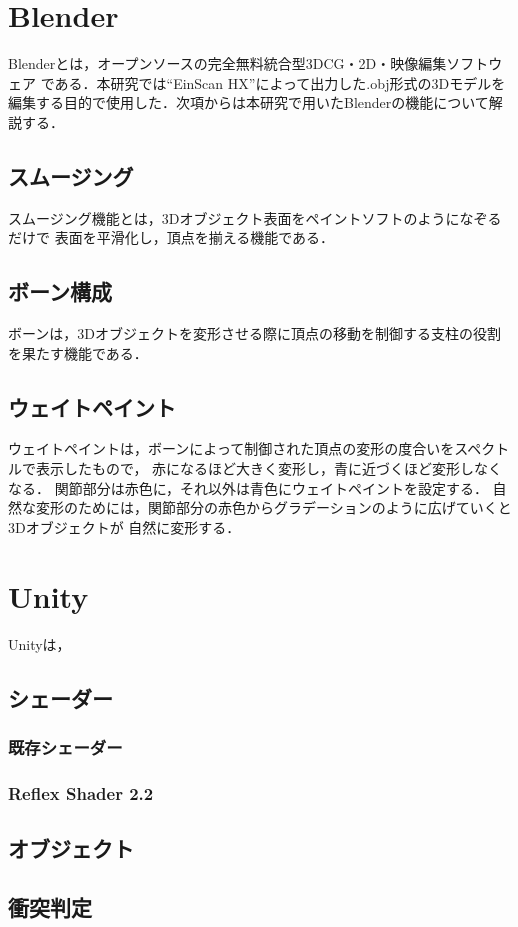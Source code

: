 \documentclass{ltjsreport}
\begin{document}
	\section{Blender}
	
		Blenderとは，オープンソースの完全無料統合型3DCG・2D・映像編集ソフトウェア
		である．本研究では``EinScan HX''によって出力した.obj形式の3Dモデルを
		編集する目的で使用した．次項からは本研究で用いたBlenderの機能について解説する．
		\subsection{スムージング}
			スムージング機能とは，3Dオブジェクト表面をペイントソフトのようになぞるだけで
			表面を平滑化し，頂点を揃える機能である．
		\subsection{ボーン構成}
			ボーンは，3Dオブジェクトを変形させる際に頂点の移動を制御する支柱の役割を果たす機能である．
		\subsection{ウェイトペイント}
			ウェイトペイントは，ボーンによって制御された頂点の変形の度合いをスペクトルで表示したもので，
			赤になるほど大きく変形し，青に近づくほど変形しなくなる．
			関節部分は赤色に，それ以外は青色にウェイトペイントを設定する．
			自然な変形のためには，関節部分の赤色からグラデーションのように広げていくと3Dオブジェクトが
			自然に変形する．
	\section{Unity}
		Unityは，
		\subsection{シェーダー}
			\subsubsection{既存シェーダー}
			\subsubsection{Reflex Shader 2.2}
		\subsection{オブジェクト}
		\subsection{衝突判定}
\end{document}
